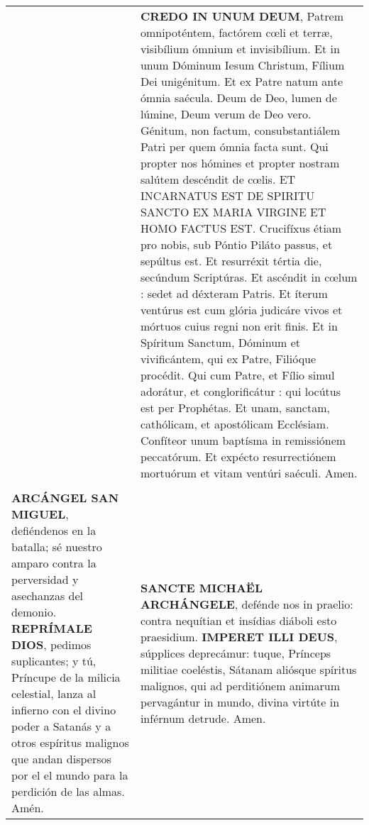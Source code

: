 \documentclass[./rosary.tex]{subfiles}
\begin{document}
\begin{longtable} { p{} p{} }
        &

    \textbf{CREDO IN UNUM DEUM}, Patrem omnipoténtem, factórem cœli et terræ, visibílium ómnium et invisibílium.
    Et in unum Dóminum Iesum Christum, Fílium Dei unigénitum. Et ex Patre natum ante ómnia saécula. Deum de Deo, lumen de lúmine, Deum verum de Deo vero.
    Génitum, non factum, consubstantiálem Patri per quem ómnia facta sunt. Qui propter nos hómines et propter nostram salútem descéndit de cœlis.
    ET INCARNATUS EST DE SPIRITU SANCTO EX MARIA VIRGINE ET HOMO FACTUS EST. Crucifíxus étiam pro nobis, sub Póntio Piláto passus, et sepúltus est.
    Et resurréxit tértia die, secúndum Scriptúras. Et ascéndit in cœlum : sedet ad déxteram Patris. Et íterum ventúrus est cum glória judicáre vivos et mórtuos cuius regni non erit finis.
    Et in Spíritum Sanctum, Dóminum et vivificántem, qui ex Patre, Filióque procédit. Qui cum Patre, et Fílio simul adorátur, et conglorificátur : qui locútus est per Prophétas.
    Et unam, sanctam, cathólicam, et apostólicam Ecclésiam. Confíteor unum baptísma in remissiónem peccatórum. Et expécto resurrectiónem mortuórum et vitam ventúri saéculi. Amen.\\\\

    \label{saintMichael}
    \textbf{ARCÁNGEL SAN MIGUEL}, defiéndenos en la batalla; sé nuestro amparo contra la perversidad y asechanzas del demonio. \textbf{REPRÍMALE DIOS}, pedimos
    suplicantes; y tú, Príncupe de la milicia celestial, lanza al infierno con el divino poder a Satanás y a otros espíritus malignos que andan dispersos por el
    el mundo para la perdición de las almas. Amén.
    
        &

    \textbf{SANCTE MICHAËL ARCHÁNGELE}, defénde nos in praelio: contra nequítian et insídias diáboli esto praesidium. \textbf{IMPERET ILLI DEUS}, 
    súpplices deprecámur: tuque, Prínceps militiae coeléstis, Sátanam aliósque spíritus malignos, qui ad perditiónem animarum pervagántur in mundo,
    divina virtúte in inférnum detrude. Amen.
\end{longtable}
\end{document}
